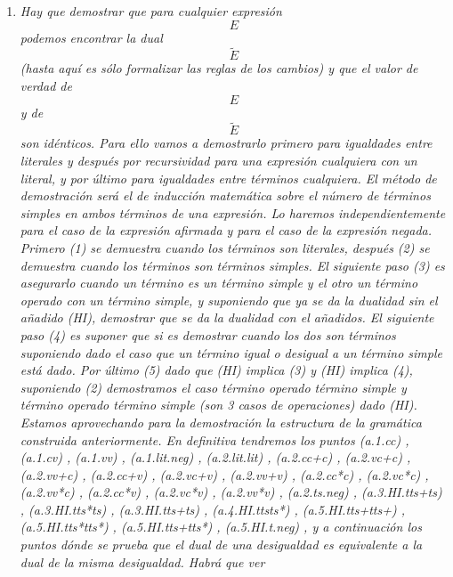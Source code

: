 \begin{enumerate}
\begin{enumerate}
\begin{enumerate}
\begin{enumerate}
        \begin{enumerate}
        \def\labelenumv{\arabic{enumv}.}
        \item
          \emph{Hay que demostrar que para cualquier expresión
          \[E\]pode\-mos encontrar la dual \[\widetilde{E}\](hasta aquí
          es sólo formalizar las reglas de los cambios) y que el valor
          de verdad de \[E\] y de \[\widetilde{E}\] son idénticos. Para
          ello vamos a demos\-trarlo primero para igualdades entre
          literales y des\-pués por recursividad para una expresión
          cualquiera con un literal, y por último para igualdades entre
          términos cualquiera. El método de demostración será el de
          induc\-ción matemática sobre el número de términos simples en
          ambos términos de una expresión. Lo haremos
          indepen\-dientemente para el caso de la expresión afirmada y
          para el caso de la expresión negada. Primero (1) se
          de\-muestra cuando los términos son literales, después (2) se
          demuestra cuando los términos son términos simples. El
          siguiente paso (3) es asegurarlo cuando un término es un
          término simple y el otro un término operado con un término
          simple, y suponiendo que ya se da la duali\-dad sin el añadido
          (HI), demostrar que se da la duali\-dad con el añadidos. El
          siguiente paso (4) es suponer que si es demostrar cuando los
          dos son términos supo\-niendo dado el caso que un término
          igual o desigual a un término simple está dado. Por último (5)
          dado que (HI) implica (3) y (HI) implica (4), suponiendo (2)
          de\-mostramos el caso término operado término simple y
          tér\-mino operado término simple (son 3 casos de
          operacio\-nes) dado (HI). Estamos aprovechando para la
          demostra\-ción la estructura de la gramática construida
          anterior\-mente. En definitiva tendremos los puntos (a.1.cc) ,
          (a.1.cv) , (a.1.vv) , (a.1.lit.neg) , (a.2.lit.lit) ,
          (a.2.cc+c) , (a.2.vc+c) , (a.2.vv+c) , (a.2.cc+v) , (a.2.vc+v)
          , (a.2.vv+v) , (a.2.cc*c) , (a.2.vc*c) , (a.2.vv*c) ,
          (a.2.cc*v) , (a.2.vc*v) , (a.2.vv*v) , (a.2.ts.neg) ,
          (a.3.HI.tts+ts) , (a.3.HI.tts*ts) , (a.3.HI.tts+ts) ,
          (a.4.HI.ttsts*) , (a.5.HI.tts+tts+) , (a.5.HI.tts*tts*) ,
          (a.5.HI.tts+tts*) , (a.5.HI.t.neg) , y a continuación los
          puntos dónde se prueba que el dual de una desigual\-dad es
          equivalente a la dual de la misma desigualdad. Habrá que ver
}
\end{enumerate}
\end{enumerate}
\end{enumerate}
\end{enumerate}
\end{enumerate}
